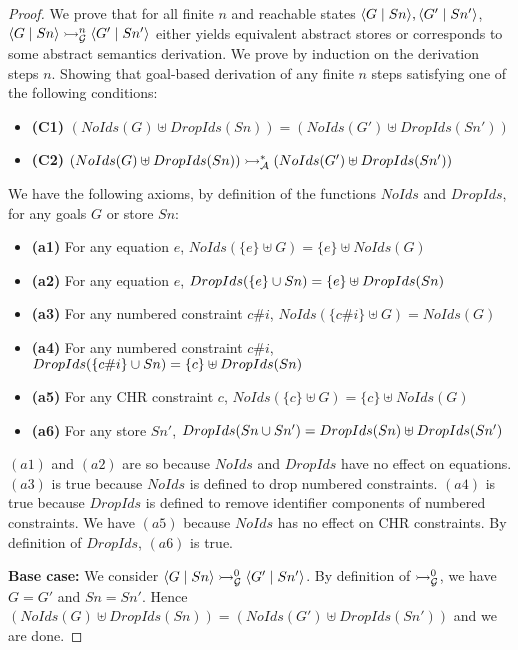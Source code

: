 \documentclass{tlp}
\begin{document}
\begin{proof}
  We prove that for all finite $n$ and reachable states $\langle G\mid Sn \rangle,\langle G'\mid Sn' \rangle$, 
  $\langle G\mid Sn \rangle \rightarrowtail_{\cal G}^n \langle G'\mid Sn' \rangle$ either yields equivalent abstract stores or 
  corresponds to some abstract semantics derivation. We prove by induction on the derivation steps $n$. 
  Showing that goal-based derivation of any finite $n$ steps satisfying one of the following conditions: 
  
  \begin{itemize}
	  \item {\bf (C1)} $(NoIds(G) \uplus DropIds(Sn)) = (NoIds(G') \uplus DropIds(Sn'))$
	  \item {\bf (C2)} $(NoIds(G) \uplus DropIds(Sn)) \rightarrowtail^*_{\cal A} (NoIds(G') \uplus DropIds(Sn'))$
  \end{itemize}
  
  We have the following axioms, by definition of the functions $NoIds$ and $DropIds$, for any goals $G$
  or store $Sn$:
  
  \begin{itemize}
	  \item {\bf (a1)} For any equation $e$, $NoIds(\{e\} \uplus G) = \{e\} \uplus NoIds(G)$
	  \item {\bf (a2)} For any equation $e$, $DropIds(\{e\} \cup Sn) = \{e\} \uplus DropIds(Sn)$
	  \item {\bf (a3)} For any numbered constraint $c\#i$, $NoIds(\{c\#i\} \uplus G) = NoIds(G)$
	  \item {\bf (a4)} For any numbered constraint $c\#i$, $DropIds(\{c\#i\} \cup Sn) = \{c\} \uplus DropIds(Sn)$
	  \item {\bf (a5)} For any CHR constraint $c$, $NoIds(\{c\} \uplus G) = \{c\} \uplus NoIds(G)$ 
	  \item {\bf (a6)} For any store $Sn'$, $DropIds(Sn \cup Sn') = DropIds(Sn) \uplus DropIds(Sn')$
  \end{itemize}
  
  $(a1)$ and $(a2)$ are so because $NoIds$ and $DropIds$ have no effect on equations. $(a3)$ is true
  because $NoIds$ is defined to drop numbered constraints. $(a4)$ is true because $DropIds$ is
  defined to remove identifier components of numbered constraints. We have $(a5)$ because $NoIds$ has
  no effect on CHR constraints. By definition of $DropIds$, $(a6)$ is true.
  
  {\bf Base case:} We consider $\langle G\mid Sn \rangle \rightarrowtail_{\cal G}^0 \langle G'\mid Sn' \rangle$. By
  definition of $\rightarrowtail_{\cal G}^0$, we have $G = G'$ and $Sn = Sn'$. Hence 
  $(NoIds(G) \uplus DropIds(Sn)) = (NoIds(G') \uplus DropIds(Sn'))$ and we are done.
  

\end{proof}
\end{document}
